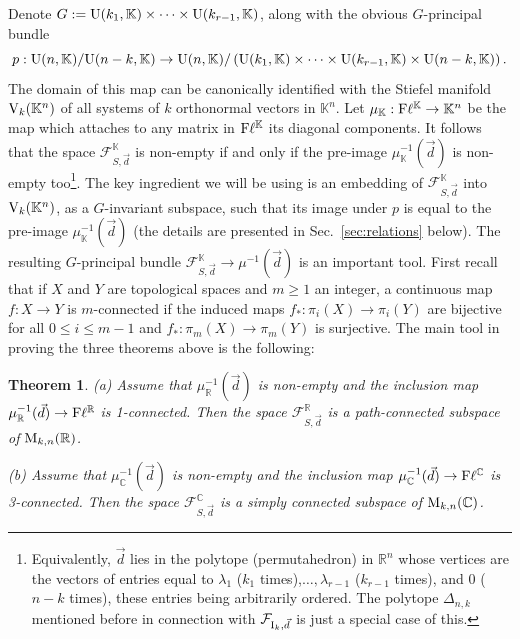 \documentclass[12pt]{amsart}
\newtheorem{thm}{Theorem}[section]
\theoremstyle{definition}
\theoremstyle{remark}
\newcommand{\RR}{\mathbb R}
\newcommand{\CC}{\mathbb C}
\newcommand{\KK}{\mathbb K}
\begin{document}
        Denote $G:={\rm U}(k_1, \KK)\times \cdots \times {\rm U}(k_{r-1}, \KK)$, along with the obvious $G$-principal bundle       $$p:{\rm U}(n, \KK)/
         {\rm U}(n-k, \KK) \to {\rm U}(n, \KK)/\left({\rm U}(k_1, \KK)\times \cdots \times {\rm U}(k_{r-1}, \KK)
        \times {\rm U}(n-k, \KK)\right).$$
        The domain of this map can be canonically identified with the Stiefel manifold ${\rm V}_k(\KK^n)$  of all systems of $k$ orthonormal vectors in $\KK^n$.  Let $\mu_\KK: {\rm F}\ell^\KK \to \KK^n$ be the map which attaches to any matrix in 
        ${\rm F}\ell^\KK$ its diagonal components. It follows that the space ${\mathcal F}_{S, \vec{d}}^\KK$ is non-empty if and only if the pre-image 
 $\mu_\KK^{-1}(\vec{d})$ is non-empty too\footnote{Equivalently, $\vec{d}$ lies in the polytope (permutahedron) in $\RR^n$ whose vertices are the vectors of entries equal to  
 $\lambda_1$ ($k_1$ times),$\ldots, \lambda_{r-1}$ ($k_{r-1}$ times), and $0$ ($n-k$ times), these entries being arbitrarily ordered. The polytope $\Delta_{n,k}$ mentioned before in connection with ${\mathcal F}_{{\rm I}_k,\vec{d}}$ is just a special case of this.}. 
    The key ingredient we will be using is an embedding of ${\mathcal F}_{S,\vec{d}}^\KK$ into ${\rm V}_k(\KK^n)$, as a $G$-invariant subspace, such that its image under $p$ is equal to the pre-image $\mu_\KK^{-1}(\vec{d})$ (the details are presented in  Sec.~\ref{sec:relations} below). 
The resulting $G$-principal bundle ${\mathcal F}_{S,\vec{d}}^\KK \to  \mu^{-1}(\vec{d})$ is an important tool. 
First recall that if $X$ and $Y$ are topological spaces and $m\ge 1$ an integer,  a continuous map $f: X \to Y$ is $m$-connected 
if the induced maps $f_*: \pi_i(X) \to \pi_i(Y)$ are bijective for all $0\le i \le m-1$ and $f_*:\pi_m(X) \to \pi_m(Y)$ is surjective. The main tool in proving the three theorems above is the following:

\begin{thm}\label{maininstr} 
(a)   Assume that $\mu_\RR^{-1}(\vec{d})$ is non-empty and the inclusion map  $\mu_\RR^{-1}(\vec{d}) \to {\rm F}\ell^\RR$ is 1-connected. Then the space ${\mathcal F}_{S,\vec{d}}^\RR$ is a path-connected subspace of ${\rm M}_{k,n}(\RR)$.

(b)   Assume that $\mu_\CC^{-1}(\vec{d})$ is non-empty and the inclusion map  $\mu_\CC^{-1}(\vec{d}) \to {\rm F}\ell^\CC$ is 3-connected. Then the space ${\mathcal F}_{S,\vec{d}}^\CC$ is a simply connected  subspace of ${\rm M}_{k,n}(\CC)$.
\end{thm}
\end{document}
